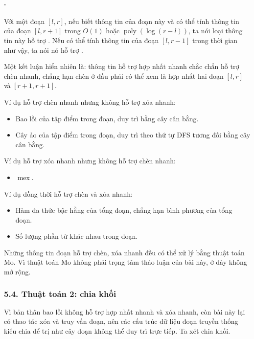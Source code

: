 \documentclass[11pt]{article}
\begin{document}
\paragraph{.}
Với một đoạn \([l,r]\), nếu biết thông tin của đoạn này và có thể tính thông
tin của đoạn \([l,r+1]\) trong \(O(1)\) hoặc \(\operatorname{poly}
(\log(r-l))\), ta nói loại thông tin này hỗ trợ . Nếu có thể
tính thông tin của đoạn \([l,r-1]\) trong thời gian như vậy, ta nói nó hỗ trợ
.

Một kết luận hiển nhiên là: thông tin hỗ trợ hợp nhất nhanh chắc chắn hỗ trợ
chèn nhanh, chẳng hạn chèn ở đầu phải có thể xem là hợp nhất hai đoạn
\([l,r]\) và \([r+1,r+1]\).

Ví dụ hỗ trợ chèn nhanh nhưng không hỗ trợ xóa nhanh:
\begin{itemize}
  \item Bao lồi của tập điểm trong đoạn, duy trì bằng cây cân bằng.
  \item Cây ảo của tập điểm trong đoạn, duy trì theo thứ tự DFS tương đối
  bằng cây cân bằng.
\end{itemize}

Ví dụ hỗ trợ xóa nhanh nhưng không hỗ trợ chèn nhanh:
\begin{itemize}
  \item \(\operatorname{mex}\).
\end{itemize}

Ví dụ đồng thời hỗ trợ chèn và xóa nhanh:
\begin{itemize}
  \item Hàm đa thức bậc hằng của tổng đoạn, chẳng hạn bình phương của tổng
  đoạn.
  \item Số lượng phần tử khác nhau trong đoạn.
\end{itemize}

Những thông tin đoạn hỗ trợ chèn, xóa nhanh đều có thể xử lý bằng thuật toán
Mo. Vì thuật toán Mo không phải trọng tâm thảo luận của bài này, ở đây không
mở rộng.

\subsubsection*{5.4. Thuật toán 2: chia khối}

Vì bản thân bao lồi không hỗ trợ hợp nhất nhanh và xóa nhanh, còn bài này lại
có thao tác xóa và truy vấn đoạn, nên các cấu trúc dữ liệu đoạn truyền thống
kiểu chia để trị như cây đoạn không thể duy trì trực tiếp. Ta xét chia khối.
\end{document}
